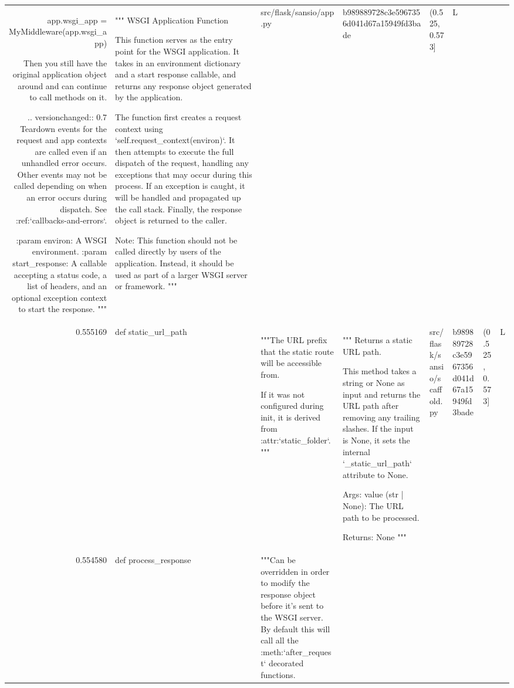 \begin{tabular}{rlllllll}
            app.wsgi_app = MyMiddleware(app.wsgi_app)

        Then you still have the original application object around and
        can continue to call methods on it.

        .. versionchanged:: 0.7
            Teardown events for the request and app contexts are called
            even if an unhandled error occurs. Other events may not be
            called depending on when an error occurs during dispatch.
            See :ref:`callbacks-and-errors`.

        :param environ: A WSGI environment.
        :param start_response: A callable accepting a status code,
            a list of headers, and an optional exception context to
            start the response.
        """ & """
WSGI Application Function

This function serves as the entry point for the WSGI application. It takes in an environment dictionary and a start response callable, 
and returns any response object generated by the application.

The function first creates a request context using `self.request_context(environ)`. It then attempts to execute the full dispatch of the request,
handling any exceptions that may occur during this process. If an exception is caught, it will be handled and propagated up the call stack.
Finally, the response object is returned to the caller.

Note: This function should not be called directly by users of the application. Instead, it should be used as part of a larger WSGI server or framework.
""" & src/flask/sansio/app.py & b989889728c3e5967356d041d67a15949fd3bade & (0.525, 0.573] & L \\
0.555169 & def static_url_path & """The URL prefix that the static route will be accessible from.

        If it was not configured during init, it is derived from
        :attr:`static_folder`.
        """ & """
Returns a static URL path.

This method takes a string or None as input and returns the URL path after removing any trailing slashes. If the input is None, it sets the internal `_static_url_path` attribute to None.

Args:
    value (str | None): The URL path to be processed.

Returns:
    None
""" & src/flask/sansio/scaffold.py & b989889728c3e5967356d041d67a15949fd3bade & (0.525, 0.573] & L \\
0.554580 & def process_response & """Can be overridden in order to modify the response object
        before it's sent to the WSGI server.  By default this will
        call all the :meth:`after_request` decorated functions.


\end{tabular}
